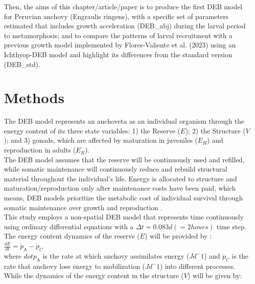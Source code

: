 Then, the aims of this chapter/article/paper is to produce the first DEB model for Peruvian anchovy (Engraulis ringens),  with a specific set of parameters estimated  that includes growth acceleration (DEB_abj)  during the larval period to metamorphosis; and to compare the patterns of larval recruitment with  a previous growth model implemented by Flores-Valiente et al. (2023) using an Ichthyop-DEB model and highlight its differences from the standard version (DEB_std).\\

\clearpage
\section{Methods}

The DEB model represents an anchoveta as an individual organism through the energy content of its three state variables: 1) the Reserve ($E$); 2) the Structure ($V$); and 3) gonads, which are affected by maturation in juveniles ($E_{H}$) and reproduction in adults ($E_{R}$).\\

The DEB model assumes that the reserve will be continuously used and refilled, while somatic
maintenance will continuously reduce and rebuild structural material throughout the individual's life. Energy is allocated to structure and maturation/reproduction only after maintenance costs have been paid, which means, DEB models prioritize the metabolic cost of individual survival through somatic maintenance over growth and reproduction \citep{Kooi2009}.\\

This study employs a non-spatial DEB model that represents time continuously using ordinary differential equations with a $\Delta t = 0.083 d \left (=2hours\right )$ time step.\\

The energy content dynamics of the reserve ($E$) will be provided by :\\

$\frac{dE}{dt} = \dot{p}_\mathrm{A} - \dot{p}_{C}$\\

where $dot{p}_\mathrm{A}$ is the rate at which anchovy assimilates energy ($Jd^-{1}$) and $\dot{p}_{C}$ is the rate that anchovy lose energy to mobilization ($Jd^-{1}$) into different processes.\\

While the dynamics of the energy content in the structure ($V$) will be given by:\\


